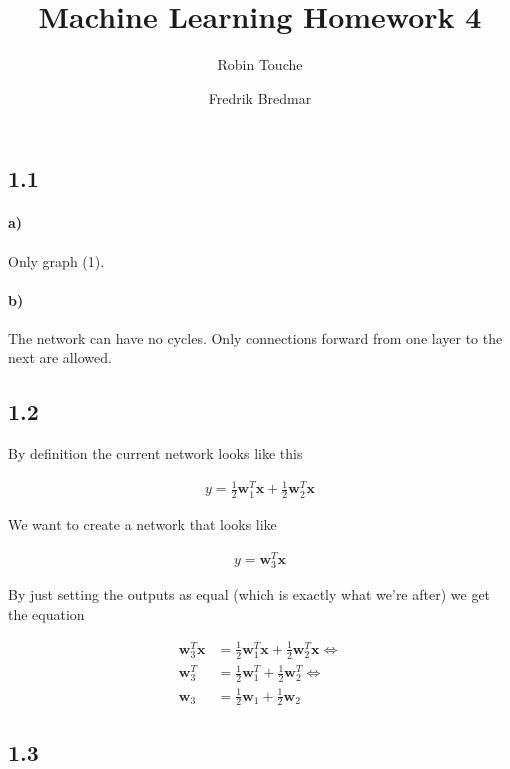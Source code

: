\documentclass{article}
\author{
  Robin Touche \\
  \and
  Fredrik Bredmar
}
\title{Machine Learning Homework 4}
\begin{document}
\maketitle

\subsection*{1.1}
\paragraph{a)}

Only graph (1).

\paragraph{b)}

The network can have no cycles. Only connections forward from one layer to the
next are allowed.

\subsection*{1.2}

By definition the current network looks like this

\begin{align}
  y = \frac{1}{2}\mathbf{w}_1^T \mathbf{x} + \frac{1}{2}\mathbf{w}_2^T \mathbf{x}
\end{align}

We want to create a network that looks like

\begin{align}
  y = \mathbf{w}_3^T \mathbf{x}
\end{align}

By just setting the outputs as equal (which is exactly what we're after) we get
the equation

\begin{align}
  \nonumber \mathbf{w}_3^T \mathbf{x} &= \frac{1}{2}\mathbf{w}_1^T \mathbf{x} + \frac{1}{2}\mathbf{w}_2^T \mathbf{x} \Leftrightarrow\\
  \mathbf{w}_3^T &= \frac{1}{2}\mathbf{w}_1^T + \frac{1}{2}\mathbf{w}_2^T \Leftrightarrow\\
  \nonumber \mathbf{w}_3 &= \frac{1}{2}\mathbf{w}_1 + \frac{1}{2}\mathbf{w}_2
\end{align}

\subsection*{1.3}
\end{document}

